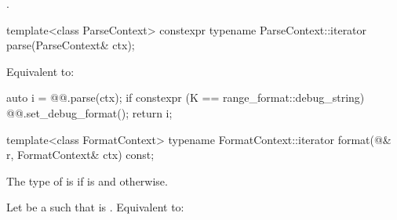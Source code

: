 \documentclass{wg21}
\begin{document}
\pnum
\mandates
{}.



\begin{itemdecl}
    template<class ParseContext>
    constexpr typename ParseContext::iterator
    parse(ParseContext& ctx);
\end{itemdecl}

\begin{itemdescr}
    \pnum
    \effects
    Equivalent to:
    \begin{codeblock}
        auto i = @@.parse(ctx);
        if constexpr (K == range_format::debug_string) {
            @@.set_debug_format();
        }
        return i;
    \end{codeblock}
\end{itemdescr}

\begin{itemdecl}
    template<class FormatContext>
    typename FormatContext::iterator
    format(@\seebelow@& r, FormatContext& ctx) const;
\end{itemdecl}

\begin{itemdescr}
    \pnum
    The type of  is 
    if  is  and
     otherwise.

    \pnum
    \effects
    Let  be a  such that
     is .
    Equivalent to: 
\end{itemdescr}
\end{document}
